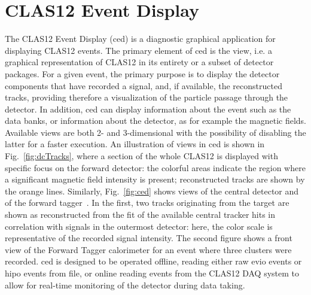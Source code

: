 \section{CLAS12 Event Display}
The CLAS12 Event Display (ced) is a diagnostic graphical application for displaying CLAS12 events.
The primary element of ced is the view, i.e. a graphical representation of CLAS12 in its
entirety or a subset of detector packages.  For a given event, the primary purpose is to display the detector components that have recorded a signal, and, if available, the reconstructed tracks, providing therefore a visualization of the particle passage through the detector. In addition, ced can display information about the event such as the data banks, or information about the detector, as for example the magnetic fields. Available views are both 2- and 3-dimensional with the possibility of disabling the latter for a faster execution. An illustration of views in ced is shown in Fig.~\ref{fig:dcTracks}, where a section of the whole CLAS12 is displayed with specific focus on the forward detector: the colorful areas indicate the region where a significant magnetic field intensity is present; reconstructed tracks are shown by the orange lines. Similarly, Fig.~\ref{fig:ced} shows views of the central detector and of the forward tagger~\cite{ft-nim}. In the first, two tracks originating from the target are shown as reconstructed from the fit of the available central tracker hits in correlation with signals in the outermost detector: here, the color scale is representative of the recorded signal intensity. The second figure shows a front view of the Forward Tagger calorimeter for an event where three clusters were recorded.
ced is designed to be operated offline, reading either raw evio events or hipo events from file, or online reading events from the CLAS12 DAQ system \cite{daq-nim} to allow for real-time monitoring of the detector during data taking.
 
